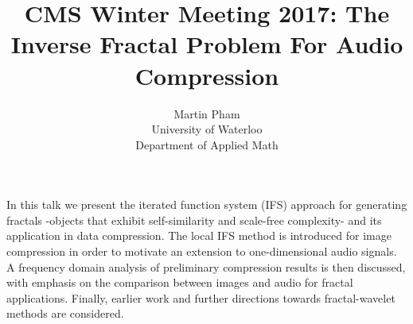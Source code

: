 \documentclass[11pt, oneside]{article}   	%
\title{CMS Winter Meeting 2017: The Inverse Fractal Problem For Audio Compression}
\author{Martin Pham\\ University of Waterloo \\ Department of Applied Math}
\begin{document}
\maketitle

In this talk we present the iterated function system (IFS) approach for generating fractals -objects that exhibit self-similarity and scale-free complexity- and its application in data compression.
The local IFS method is introduced for image compression in order to motivate an extension to one-dimensional audio signals.
A frequency domain analysis of preliminary compression results is then discussed, with emphasis on the comparison between images and audio for fractal applications.
Finally, earlier work and further directions towards fractal-wavelet methods are considered.



\end{document}
